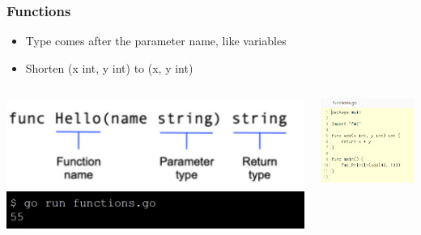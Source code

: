 \documentclass[14pt]{beamer}
\begin{document}
{
\begin{frame}
    \frametitle{Functions}
    \begin{itemize}
\item Type comes after the parameter name, like variables
\item Shorten (x int, y int) to (x, y int)
    \end{itemize}
        \begin{columns}
            \begin{column}{0.5\textwidth}
                \includegraphics[width=\linewidth]{img/function.PNG}
                \linebreak
                \linebreak
                \linebreak
                \linebreak
                \includegraphics[width=\linewidth]{img/functionscommand.PNG}
            \end{column}
            \begin{column}{0.5\textwidth}
                \includegraphics[width=\linewidth]{img/functions.PNG}
            \end{column}
        \end{columns}
\end{frame}
}
\end{document}
